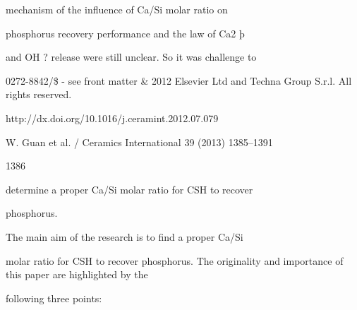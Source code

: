 \documentclass[a4paper,portrait,12pt]{article}
\begin{document}
\begin{flushleft}
mechanism of the inﬂuence of Ca/Si molar ratio on
\end{flushleft}


\begin{flushleft}
phosphorus recovery performance and the law of Ca2 þ
\end{flushleft}


\begin{flushleft}
and OH ? release were still unclear. So it was challenge to
\end{flushleft}





\begin{flushleft}
0272-8842/\$ - see front matter \& 2012 Elsevier Ltd and Techna Group S.r.l. All rights reserved.
\end{flushleft}


\begin{flushleft}
http://dx.doi.org/10.1016/j.ceramint.2012.07.079
\end{flushleft}





\begin{flushleft}
\newpage
W. Guan et al. / Ceramics International 39 (2013) 1385--1391
\end{flushleft}





1386





\begin{flushleft}
determine a proper Ca/Si molar ratio for CSH to recover
\end{flushleft}


\begin{flushleft}
phosphorus.
\end{flushleft}


\begin{flushleft}
The main aim of the research is to ﬁnd a proper Ca/Si
\end{flushleft}


\begin{flushleft}
molar ratio for CSH to recover phosphorus. The originality and importance of this paper are highlighted by the
\end{flushleft}


\begin{flushleft}
following three points:
\end{flushleft}
\end{document}
